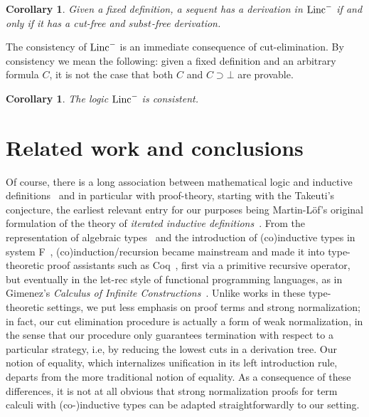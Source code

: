 \documentclass[preprint]{elsarticle}
\newcommand{\Linc}{{\rm Linc}^-}
\newcommand{\oimp}{\supset}
\newtheorem{corollary}[thm]{Corollary}
\begin{document}
\begin{corollary}
  \label{cor:cut-elimination}
  Given a fixed definition, a sequent has a derivation in $\Linc$ if
  and only if it has a cut-free and $subst$-free derivation.
\end{corollary}

The consistency of $\Linc$ is an immediate consequence of
cut-elimination.  By consistency we mean the following: given a fixed
definition and an arbitrary formula $C$, it is not the case
that both $C$ and $C\oimp \bot$ are provable.

\begin{corollary}
  \label{cor:consistency}
  The logic $\Linc$ is consistent.
\end{corollary}



\section{Related work and conclusions}
\label{sec:lrel}


Of course, there is a long association between mathematical logic and
inductive definitions~\cite{Acz77} and in particular with
proof-theory, starting with the Takeuti's conjecture, the earliest
relevant entry for our purposes being Martin-L\"of's original
formulation of the theory of \emph{iterated inductive
  definitions}~\cite{martin-lof71sls}.  From the representation of
algebraic types~\cite{Bohm85} and the introduction of (co)inductive
types in system F~\cite{Mendler87,Geuvers92}, (co)induction/recursion
became mainstream and made it into type-theoretic proof assistants such as
Coq~\cite{PaulinMohring93}, first via a primitive recursive operator,
but eventually in the let-rec style of functional programming
languages, as in Gimenez's \emph{Calculus of Infinite
  Constructions}~\cite{Gim96phd}.  Unlike works in these
type-theoretic settings, we put less emphasis on proof terms and
strong normalization; in fact, our cut elimination procedure is
actually a form of weak normalization, in the sense that our procedure
only guarantees termination with respect to a particular strategy,
i.e, by reducing the lowest cuts in a derivation tree.  Our notion of
equality, which internalizes unification in its left introduction
rule, departs from the more traditional notion of equality.  As a
consequence of these differences, it is not at all obvious that strong
normalization proofs for term calculi with (co-)inductive types can be
adapted straightforwardly to our setting.
\end{document}
